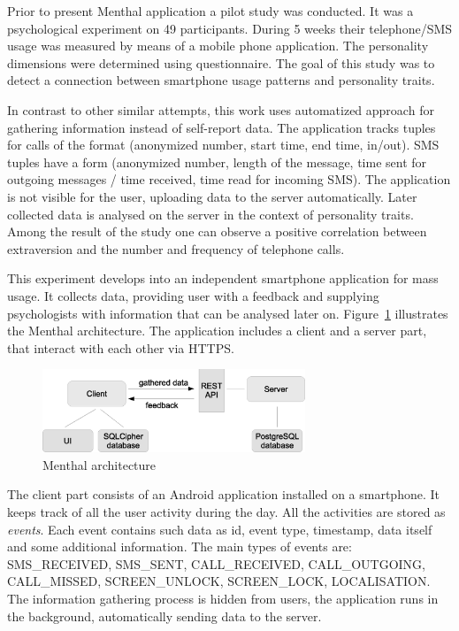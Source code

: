 Prior to present Menthal application a pilot study was conducted. 
It was a psychological experiment on 49 participants.
During 5 weeks their telephone/SMS usage was measured by means of a mobile phone application.
The personality dimensions were determined using questionnaire.
The goal of this study was to detect a connection between smartphone usage patterns and personality traits.

In contrast to other similar attempts, this work uses automatized approach for gathering information instead of self-report data.
The application tracks tuples for calls of the format (anonymized number, start time, end time, in/out).
SMS tuples have a form (anonymized number, length of the message, time sent for outgoing messages / time received, time read for incoming SMS).
The application is not visible for the user, uploading data to the server automatically.
Later collected data is analysed on the server in the context of personality traits.
Among the result of the study one can observe a positive correlation between extraversion and the number and frequency of telephone calls.

This experiment develops into an independent smartphone application for mass usage. 
It collects data, providing user with a feedback and supplying psychologists with information that can be analysed later on.
Figure~\ref{fig:menthal_architecture} illustrates the Menthal architecture.
The application includes a client and a server part, that interact with each other via HTTPS.

\begin{figure}[h]
  \centering
  \includegraphics [width=0.7\textwidth]{images/Menthal_architecture}
  \caption{Menthal architecture}
  \label{fig:menthal_architecture}
\end{figure}

The client part consists of an Android application installed on a smartphone.
It keeps track of all the user activity during the day.
All the activities are stored as \textit{events}.
Each event contains such data as id, event type, timestamp, data itself and some additional information.
The main types of events are: SMS\_RECEIVED, SMS\_SENT, CALL\_RECEIVED, CALL\_OUTGOING, CALL\_MISSED, SCREEN\_UNLOCK, SCREEN\_LOCK, LOCALISATION.
The information gathering process is hidden from users, the application runs in the background, automatically sending data to the server.

